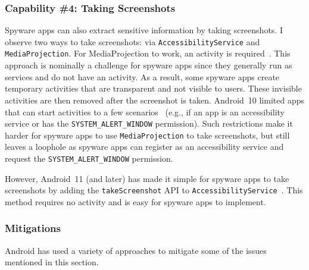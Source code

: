 
\subsubsection*{Capability \#4: Taking Screenshots}
\label{subsubsec:screenshot}
Spyware apps can also extract sensitive information by taking screenshots. I
observe two ways to take screenshots: via
\texttt{AccessibilityService} and \texttt{MediaProjection}. For MediaProjection
to work, an activity is required~\cite{androidH20:online}. This approach is
nominally a challenge for spyware apps since they generally run as services and
do not have an activity. As a result, some spyware apps create temporary
activities that are transparent and not visible to users. These invisible
activities are then removed after the screenshot is taken.  Android~10 limited
apps that can start activities to a few scenarios~\cite{Restrict50:online}
(e.g., if an app is an accessibility service or has the \texttt{SYSTEM\_ALERT\_WINDOW}
permission). Such restrictions make it harder for spyware apps to use
\texttt{MediaProjection} to take screenshots, but still leaves a loophole as spyware apps
can register as an accessibility service and request the \texttt{SYSTEM\_ALERT\_WINDOW}
permission.

However, Android~11 (and later) has made it
simple for spyware apps to take screenshots by adding the
\texttt{takeScreenshot} API to \texttt{AccessibilityService}~\cite{Accessib97:online}.
This method requires no activity and is easy for spyware apps to implement.


\subsubsection{Mitigations}
Android has used a variety of approaches to mitigate some of the issues mentioned in this section.

